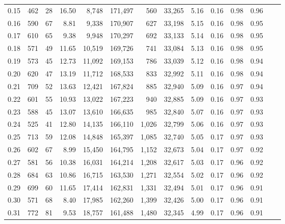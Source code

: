 \begin{tabular}{rrrrrrrrrrrrrr}
0.15 &    462 &     28 &   16.50 &    8,748 &  171,497 &     560 &  33,265 &  5.16 &  0.16 &  0.98 &      0.96 \\
0.16 &    590 &     67 &    8.81 &    9,338 &  170,907 &     627 &  33,198 &  5.15 &  0.16 &  0.98 &      0.95 \\
0.17 &    610 &     65 &    9.38 &    9,948 &  170,297 &     692 &  33,133 &  5.14 &  0.16 &  0.98 &      0.95 \\
0.18 &    571 &     49 &   11.65 &   10,519 &  169,726 &     741 &  33,084 &  5.13 &  0.16 &  0.98 &      0.95 \\
0.19 &    573 &     45 &   12.73 &   11,092 &  169,153 &     786 &  33,039 &  5.12 &  0.16 &  0.98 &      0.94 \\
0.20 &    620 &     47 &   13.19 &   11,712 &  168,533 &     833 &  32,992 &  5.11 &  0.16 &  0.98 &      0.94 \\
0.21 &    709 &     52 &   13.63 &   12,421 &  167,824 &     885 &  32,940 &  5.09 &  0.16 &  0.97 &      0.94 \\
0.22 &    601 &     55 &   10.93 &   13,022 &  167,223 &     940 &  32,885 &  5.09 &  0.16 &  0.97 &      0.93 \\
0.23 &    588 &     45 &   13.07 &   13,610 &  166,635 &     985 &  32,840 &  5.07 &  0.16 &  0.97 &      0.93 \\
0.24 &    525 &     41 &   12.80 &   14,135 &  166,110 &   1,026 &  32,799 &  5.06 &  0.16 &  0.97 &      0.93 \\
0.25 &    713 &     59 &   12.08 &   14,848 &  165,397 &   1,085 &  32,740 &  5.05 &  0.17 &  0.97 &      0.93 \\
0.26 &    602 &     67 &    8.99 &   15,450 &  164,795 &   1,152 &  32,673 &  5.04 &  0.17 &  0.97 &      0.92 \\
0.27 &    581 &     56 &   10.38 &   16,031 &  164,214 &   1,208 &  32,617 &  5.03 &  0.17 &  0.96 &      0.92 \\
0.28 &    684 &     63 &   10.86 &   16,715 &  163,530 &   1,271 &  32,554 &  5.02 &  0.17 &  0.96 &      0.92 \\
0.29 &    699 &     60 &   11.65 &   17,414 &  162,831 &   1,331 &  32,494 &  5.01 &  0.17 &  0.96 &      0.91 \\
0.30 &    571 &     68 &    8.40 &   17,985 &  162,260 &   1,399 &  32,426 &  5.00 &  0.17 &  0.96 &      0.91 \\
0.31 &    772 &     81 &    9.53 &   18,757 &  161,488 &   1,480 &  32,345 &  4.99 &  0.17 &  0.96 &      0.91 \\

\end{tabular}
